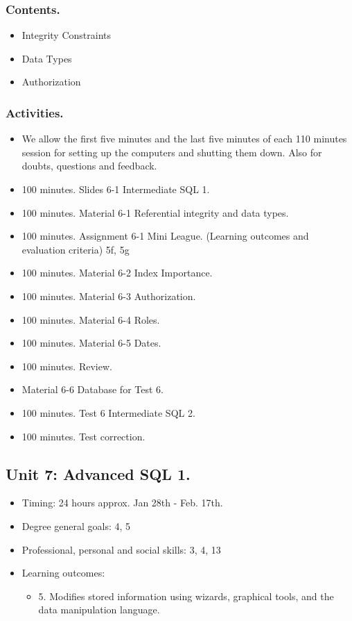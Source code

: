\documentclass[catalan, a4paper, 12pt, titlepage]{article}
\begin{document}
  \subsubsection{Contents.}
  \begin{itemize}
	  \item Integrity Constraints
	  \item Data Types
	  \item Authorization
  \end{itemize}

  \subsubsection{Activities.}
  \begin{itemize}
          \item We allow the first five minutes and the last five minutes of each 110 minutes session for setting up the computers and shutting them down. Also for doubts, questions and feedback.
	  \item 100 minutes. Slides 6-1 Intermediate SQL 1.
	  \item 100 minutes. Material 6-1 Referential integrity and data types.
	  \item 100 minutes. Assignment 6-1 Mini League. (\faGraduationCap Learning outcomes and evaluation criteria) 5f, 5g
	  \item 100 minutes. Material 6-2 Index Importance.
	  \item 100 minutes. Material 6-3 Authorization.
	  \item 100 minutes. Material 6-4 Roles.
	  \item 100 minutes. Material 6-5 Dates.
	  \item 100 minutes. Review.
	  \item Material 6-6 Database for Test 6.
	  \item 100 minutes. Test 6 Intermediate SQL 2.
	  \item 100 minutes. Test correction.
  \end{itemize}
  

  \subsection{Unit 7: Advanced SQL 1.}

  \begin{itemize}
	\item Timing: 24 hours approx. Jan 28th - Feb. 17th.
	\item Degree general goals: 4, 5
	\item Professional, personal and social skills: 3, 4, 13
	\item Learning outcomes: 
		\begin{itemize}
			\item 5. Modifies stored information using wizards, graphical tools, and the data manipulation language.
		\end{itemize}
  \end{itemize}
  
\end{document}
